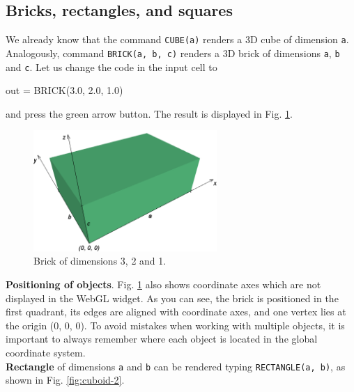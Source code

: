 \subsection{Bricks, rectangles, and squares}

We already know that the command {\tt CUBE(a)} renders a 3D cube of
dimension {\tt a}. Analogously, command {\tt BRICK(a, b, c)} 
renders a 3D brick of dimensions {\tt a}, {\tt b} and {\tt c}. 
Let us change the code in the input cell to  

\begin{bluecode}
out = BRICK(3.0, 2.0, 1.0)
\end{bluecode}
and press the green arrow button. The result is displayed in Fig. \ref{fig:cuboid-1}.\\

\begin{figure}[!ht]
\begin{center}
\includegraphics[width=0.62\textwidth]{img/cuboid-1.png}
\end{center}
\vspace{-4mm}
\caption{Brick of dimensions 3, 2 and 1.}
\label{fig:cuboid-1}
\end{figure}
\newpage

\noindent
{\bf Positioning of objects}.
Fig. \ref{fig:cuboid-1} also shows coordinate axes which are not
displayed in the WebGL widget. As you can see, the brick is positioned 
in the first quadrant, its edges are aligned with coordinate axes, and one 
vertex lies at the origin (0, 0, 0). To avoid mistakes when working with 
multiple objects, it is important to always remember where
each object is located in the global coordinate system. \\

\noindent
{\bf Rectangle} of dimensions {\tt a} and {\tt b} can be rendered typing 
{\tt RECTANGLE(a, b)}, as shown in Fig. \ref{fig:cuboid-2}.

